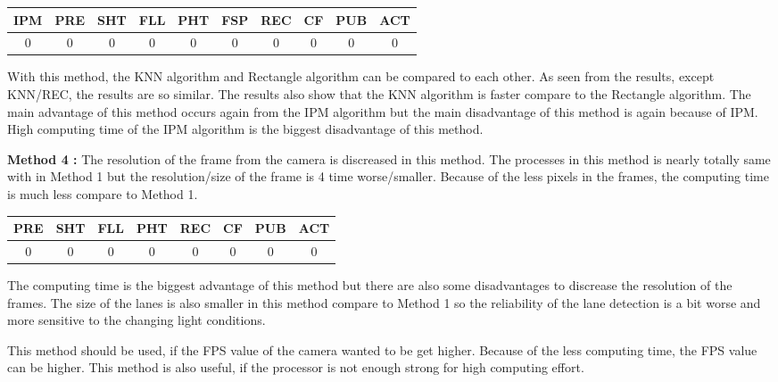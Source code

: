 \begin{center}
  \begin{tabular}{ | c | c | c | c | c | c | c | c | c | c |}
    \hline
  
  IPM 		& PRE 		& SHT	   & FLL 	   & PHT 	   & FSP 	    & REC 	   & CF 	  & PUB 	& ACT \\ \hline  
  0 & 0 & 0 & 0 & 0 & 0 & 0 & 0 & 0       & 0   \\ \hline  
    
    
      \end{tabular}
  \label{tab:Case3_Times}
\end{center}

With this method, the KNN algorithm and Rectangle algorithm can be compared to each other. As seen from the results, except KNN/REC, the results are so similar. The results also show that the KNN algorithm is faster compare to the Rectangle algorithm. The main advantage of this method occurs again from the IPM algorithm but the main disadvantage of this method is again because of IPM. High computing time of the IPM algorithm is the biggest disadvantage of this method.

\textbf{Method 4 : }The resolution of the frame from the camera is discreased in this method. The processes in this method is nearly totally same with in Method 1 but the resolution/size of the frame is 4 time worse/smaller. Because of the less pixels in the frames, the computing time is much less compare to Method 1.



\begin{center}
  \begin{tabular}{ | c | c | c | c | c | c | c | c |}
    \hline
  
  PRE & SHT & FLL & PHT & REC & CF & PUB & ACT \\ \hline  
  0   &  0  &  0  &  0  &  0  &  0 &  0  &  0 \\ \hline  
    
    
      \end{tabular}
  \label{tab:Case4_Times}
\end{center}

The computing time is the biggest advantage of this method but there are also some disadvantages to discrease the resolution of the frames. The size of the lanes is also smaller in this method compare to Method 1 so the reliability of the lane detection is a bit worse and more sensitive to the changing light conditions.

This method should be used, if the FPS value of the camera wanted to be get higher. Because of the less computing time, the FPS value can be higher. This method is also useful, if the processor is not enough strong for high computing effort.



